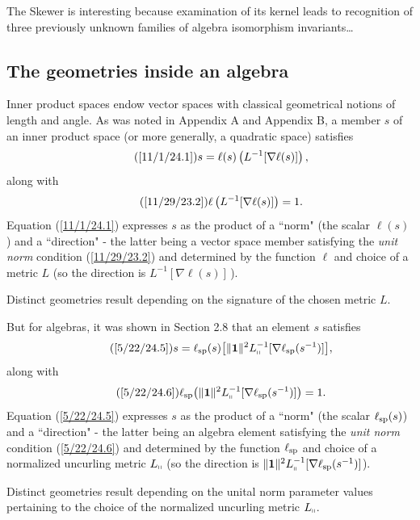 \documentclass{amsart}
\numberwithin{equation}{section}
\theoremstyle{definition}
\numberwithin{theorem}{section}
\begin{document}
The Skewer is interesting because examination of its kernel leads to recognition of three previously unknown families of algebra isomorphism invariants\dots
 
\subsection{The geometries inside an algebra} Inner product spaces endow vector spaces with classical geometrical notions of length and angle.  As was noted in Appendix A and Appendix B, a member $s$ of an inner product space (or more generally, a quadratic space) satisfies \begin{equation}\tag{\ref{11/1/24.1}} s = \ell(s)\left(L^{-1}[\nabla\ell(s)]\right),\end{equation}  along with 
\begin{equation}\tag{\ref{11/29/23.2}}\ell\left(L^{-1}[\nabla\ell(s)]\right) = 1.\end{equation} 
Equation (\ref{11/1/24.1}) expresses $s$ as the product of a ``norm" (the scalar $\ell(s)$) and a \mbox{``direction"} -  the latter being a vector space member satisfying the {\it unit norm} condition (\ref{11/29/23.2}) and determined by the function $\ell$ and choice of a metric $L$ (so the direction is $L^{-1}[\nabla\ell(s)]$\,).  

Distinct geometries result depending on the signature of the chosen metric $L$. 

\enlargethispage{1cm}
 But for algebras, it was shown in Section 2.8 that an element $s$ satisfies \begin{equation}\tag{\ref{5/22/24.5}}  s = \ell_{\rm sp}(s)\big[\|\mathbf{1}\|^2 L_{\shortparallel}^{-1}[\nabla\ell_{\rm sp}(s^{-1})]\big],\end{equation} along with
\begin{equation}\tag{\ref{5/22/24.6}}\ell_{\rm sp}\big(\|\mathbf{1}\|^2 L_{\shortparallel}^{-1}[\nabla\ell_{\rm sp}(s^{-1})]\big) = 1.\end{equation}
Equation (\ref{5/22/24.5}) expresses $s$ as the product of a ``norm" (the scalar $\ell_{\rm sp}(s)$) and a ``direction" - the latter being an algebra element satisfying the {\it unit norm} condition (\ref{5/22/24.6}) and determined by the function $\ell_{\rm sp}$ and choice of a normalized uncurling metric $L_{\shortparallel}$ (so the direction is $\|\mathbf{1}\|^2L_{\shortparallel}^{-1}[\nabla\ell_{\rm sp}(s^{-1})]$).

Distinct geometries result depending on the unital norm parameter values pertaining to the choice of the normalized uncurling metric $L_{\shortparallel}$.
\end{document}

